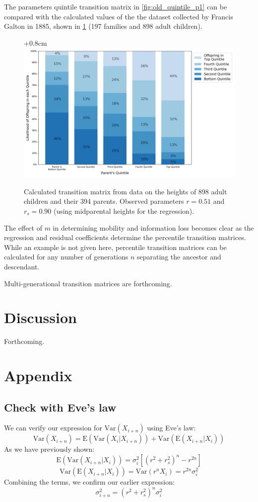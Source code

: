 \documentclass[letterpaper,10pt]{article} %
\begin{document}
The parameters quintile transition matrix in \ref{fig:old_quintile_p1} can be compared with the calculated values of the the dataset collected by Francis Galton in 1885, shown in  \ref{fig:old_galton_quintile} (197 families and 898 adult children). 

\begin{figure}[h]
\centering
\advance\leftskip+0.8cm
\includegraphics[width=0.8\linewidth]{figures/galton_mobility.png} 
\caption{Calculated transition matrix from data on the heights of 898 adult children and their 394 parents. Observed parameters $r = 0.51$ and $r_s = 0.90$ (using midparental heights for the regression).}
\label{fig:old_galton_quintile}
\end{figure}


The effect of $m$ in determining mobility and information loss becomes clear as the regression and residual coefficients determine the percentile transition matrices. While an example is not given here, percentile transition matrices can be calculated for any number of generations $n$ separating the ancestor and descendant. 

Multi-generational transition matrices are forthcoming.

\section{Discussion}
Forthcoming.





\clearpage


\section{Appendix}

\subsection*{Check with Eve's law}
We can verify our expression for $\mathrm{Var}(X_{i+n})$ using Eve's law:
%
$$\mathrm{Var}(X_{i+n}) = \mathrm{E}(\mathrm{Var}(X_i|X_{i+n})) + \mathrm{Var}(\mathrm{E}(X_{i+n}|X_i))$$
%
As we have previously shown:
%
$$\mathrm{E}(\mathrm{Var}(X_{i+n}|X_i)) = \sigma_i^2 [(r^2+r_s^2)^n-r^{2n}]$$
$$\mathrm{Var}(\mathrm{E}(X_{i+n}|X_i)) = \mathrm{Var}(r^nX_i) = r^{2n}\sigma_i^2$$
%
Combining the terms, we confirm our earlier expression:
%
$$\sigma_{i+n}^2 = (r^2+r_s^2)^n  \sigma_i^2$$
\end{document}
